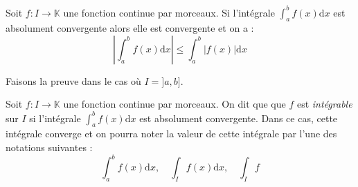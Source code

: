 \documentclass[french,11pt,twoside]{VcCours}
\newcommand{\dx}{\text{d}x}
\newcommand{\dt}{\text{d}t}
\begin{document}
\begin{Proposition}{} Soit $f : I \rightarrow \mathbb{K}$ une fonction continue par morceaux. Si l'intégrale $\int_{a}^b f(x) \dx$ est absolument convergente alors elle est convergente et on a :
$$ \left\vert \int_{a}^b  f(x)  \dx \right\vert \leq \int_{a}^b \vert f(x) \vert \dx $$
\end{Proposition}

\begin{Demonstration}{} Faisons la preuve dans le cas où $I = ]a,b]$. 

%
%


\vspace{11cm}
\end{Demonstration}

\begin{Definition}{} Soit $f : I \rightarrow \mathbb{K}$ une fonction continue par morceaux. On dit que que $f$ est \emph{intégrable} sur $I$ si l'intégrale $\int_{a}^b f(x) \dx$ est absolument convergente. Dans ce cas, cette intégrale converge et on pourra noter la valeur de cette intégrale par l'une des notations suivantes :
$$ \int_{a}^b f(x) \dx, \quad \int_{I} f(x) \dx, \quad \int_I f$$
\end{Definition}
\end{document}
